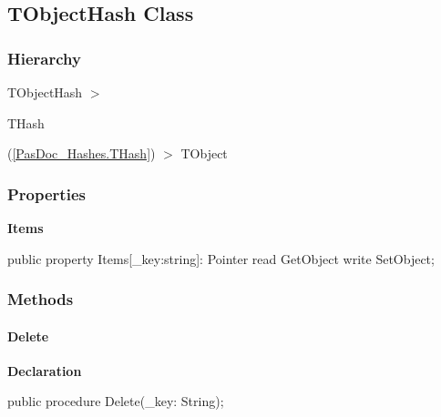 \documentclass{report}
\newif\ifpdf
\begin{document}
\subsection*{TObjectHash Class}
\fi
\label{PasDoc_Hashes.TObjectHash}
\subsubsection*{\large{\textbf{Hierarchy}}\normalsize\hspace{1ex}\hfill}
TObjectHash {$>$} \begin{ttfamily}THash\end{ttfamily}(\ref{PasDoc_Hashes.THash}) {$>$} 
TObject
\subsubsection*{\large{\textbf{Properties}}\normalsize\hspace{1ex}\hfill}
\begin{list}{}{
\setlength{\itemindent}{0cm}
\setlength{\listparindent}{0cm}
\setlength{\leftmargin}{\evensidemargin}
\addtolength{\leftmargin}{\tmplength}
\settowidth{\labelsep}{X}
\addtolength{\leftmargin}{\labelsep}
\setlength{\labelwidth}{\tmplength}
}
\label{PasDoc_Hashes.TObjectHash-Items}
\item[\textbf{Items}\hfill]
\ifpdf
\begin{flushleft}
\fi
\begin{ttfamily}
public property Items[{\_}key:string]: Pointer read GetObject write SetObject;\end{ttfamily}

\ifpdf
\end{flushleft}
\fi


\par  \end{list}
\subsubsection*{\large{\textbf{Methods}}\normalsize\hspace{1ex}\hfill}
\paragraph*{Delete}\hspace*{\fill}

\label{PasDoc_Hashes.TObjectHash-Delete}
\begin{list}{}{
\setlength{\itemindent}{0cm}
\setlength{\listparindent}{0cm}
\setlength{\leftmargin}{\evensidemargin}
\addtolength{\leftmargin}{\tmplength}
\settowidth{\labelsep}{X}
\addtolength{\leftmargin}{\labelsep}
\setlength{\labelwidth}{\tmplength}
}
\item[\textbf{Declaration}\hfill]
\ifpdf
\begin{flushleft}
\fi
\begin{ttfamily}
public procedure Delete({\_}key: String);\end{ttfamily}

\ifpdf
\end{flushleft}
\fi

\end{list}
\end{document}

